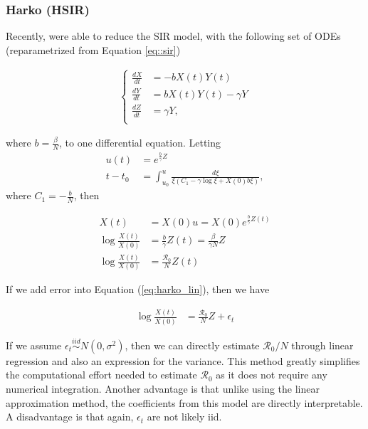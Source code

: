 \documentclass[12pt]{article}
\newcommand{\rr}{\ensuremath{\mathcal{R}_0}}
\begin{document}
\subsubsection{Harko (HSIR)}
Recently, \cite{harko2014exact} were able to reduce the SIR model, with the following set of ODEs (reparametrized from Equation \eqref{eq::sir})

\begin{align*}
  \left \{ \begin{array}{ll}
             \frac{dX}{dt} &= - b X(t) Y(t) \\
             \frac{dY}{dt} &=  b X(t) Y(t) - \gamma Y\\
             \frac{dZ}{dt} &= \gamma Y,\\
           \end{array}
  \right .
\end{align*}

where $b = \frac{\beta}{N}$, to one differential equation.  Letting
\begin{align*}
  u(t) &= e^{\frac{b}{\gamma}Z} \\
  t - t_0 &= \int_{u_0}^u \frac{d \xi}{\xi (C_1 - \gamma \log \xi + X(0) b \xi)},
\end{align*}
where $C_1 = -\frac{b}{N}$, then

\begin{align}
  X(t) &= X(0) u  = X(0) e^{\frac{b}{\gamma}Z(t)} \nonumber\\
  \log \frac{X(t)}{X(0)} &=  \frac{b}{\gamma}Z(t) =  \frac{\beta}{\gamma N} Z \nonumber\\
  \log \frac{X(t)}{X(0)} &=  \frac{\rr}{N} Z(t) \label{eq:harko_lin}
\end{align}

If we add error into Equation (\ref{eq:harko_lin}), then we have

\begin{align}
  \log \frac{X(t)}{X(0)} &=  \frac{\rr}{N} Z  + \epsilon_t\label{eq:r0_harko}
\end{align}

If we assume $\epsilon_t \overset{iid}{\sim}N(0, \sigma^2)$, then we can directly estimate $\rr/N$ through linear regression and also an expression for the variance.  This method greatly simplifies the computational effort needed to estimate $\rr$ as it does not require any numerical integration.  Another advantage is that unlike using the linear approximation method, the coefficients from this model are directly interpretable.  A disadvantage is that again, $\epsilon_t$ are  not likely iid.
\end{document}

